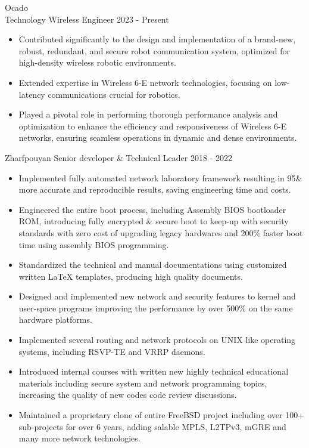 \documentclass[12pt]{developercv}
\begin{document}
\begin{entrylist}
	\entry
		{Ocado\\Technology}
		{Wireless Engineer}
		{2023 - Present}
		{
  			\begin{itemize}
				\itemsep0em
				\item Contributed significantly to the design and implementation of a brand-new, robust, redundant, and secure robot communication system, optimized for high-density wireless robotic environments.
				\item Extended expertise in Wireless 6-E network technologies, focusing on low-latency communications crucial for robotics.
				\item Played a pivotal role in performing thorough performance analysis and optimization to enhance the efficiency and responsiveness of Wireless 6-E networks, ensuring seamless operations in dynamic and dense environments.
			\end{itemize}
		}
	\entry
		{Zharfpouyan}
		{Senior developer \& Technical Leader}
		{2018 - 2022}
		{
			\begin{itemize}
				\itemsep0em
				\item Implemented fully automated network laboratory framework resulting in 95\&
				more accurate and reproducible results, saving engineering time and costs.
				\item Engineered the entire boot process, including Assembly BIOS bootloader ROM, introducing fully encrypted \& secure
				boot to keep-up with security standards with zero cost of upgrading legacy hardwares and
				200\% faster boot time using assembly BIOS programming.
				\item Standardized the technical and manual documentations using customized written \LaTeX
				templates, producing high quality documents.
				\item Designed and implemented new network and security features to kernel and user-space
				programs improving the performance by over 500\% on the same hardware platforms.
				\item Implemented several routing and network protocols on UNIX like operating systems,
				including RSVP-TE and VRRP daemons.
				\item Introduced internal courses with written new highly technical educational materials including
				secure system and network programming topics, increasing the quality of
				new codes code review discussions.
				\item Maintained a proprietary clone of entire FreeBSD project including over 100+ sub-projects
				for over 6 years, adding
				salable MPLS, L2TPv3, mGRE and many more network technologies.
			\end{itemize}

}
\end{entrylist}
\end{document}
